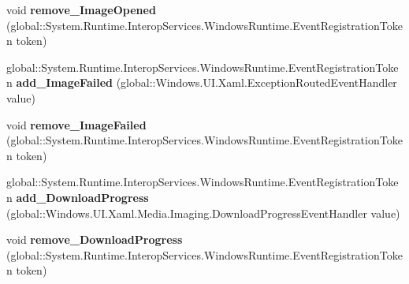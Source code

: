 \begin{DoxyCompactItemize}
\mbox{\label{interface_windows_1_1_u_i_1_1_xaml_1_1_media_1_1_imaging_1_1_i_bitmap_image_ac903f9457bc42510bd952dcb07c5c1d1}} 
void {\bfseries remove\+\_\+\+Image\+Opened} (global\+::\+System.\+Runtime.\+Interop\+Services.\+Windows\+Runtime.\+Event\+Registration\+Token token)
\item 
\mbox{\label{interface_windows_1_1_u_i_1_1_xaml_1_1_media_1_1_imaging_1_1_i_bitmap_image_a6aa4435d5ae45040075c92c78e19dabb}} 
global\+::\+System.\+Runtime.\+Interop\+Services.\+Windows\+Runtime.\+Event\+Registration\+Token {\bfseries add\+\_\+\+Image\+Failed} (global\+::\+Windows.\+U\+I.\+Xaml.\+Exception\+Routed\+Event\+Handler value)
\item 
\mbox{\label{interface_windows_1_1_u_i_1_1_xaml_1_1_media_1_1_imaging_1_1_i_bitmap_image_ab77fcc8961126a071f77bee1dc55bcc6}} 
void {\bfseries remove\+\_\+\+Image\+Failed} (global\+::\+System.\+Runtime.\+Interop\+Services.\+Windows\+Runtime.\+Event\+Registration\+Token token)
\item 
\mbox{\label{interface_windows_1_1_u_i_1_1_xaml_1_1_media_1_1_imaging_1_1_i_bitmap_image_a81353ece4edf0af8840923994b02b772}} 
global\+::\+System.\+Runtime.\+Interop\+Services.\+Windows\+Runtime.\+Event\+Registration\+Token {\bfseries add\+\_\+\+Download\+Progress} (global\+::\+Windows.\+U\+I.\+Xaml.\+Media.\+Imaging.\+Download\+Progress\+Event\+Handler value)
\item 
\mbox{\label{interface_windows_1_1_u_i_1_1_xaml_1_1_media_1_1_imaging_1_1_i_bitmap_image_ab600f3019a91621d8000a9cdc22141e7}} 
void {\bfseries remove\+\_\+\+Download\+Progress} (global\+::\+System.\+Runtime.\+Interop\+Services.\+Windows\+Runtime.\+Event\+Registration\+Token token)
\item 
\mbox{\label{interface_windows_1_1_u_i_1_1_xaml_1_1_media_1_1_imaging_1_1_i_bitmap_image_a0a0af7713d2dfccf2cd37b15f1f121ea}} 

\end{DoxyCompactItemize}
